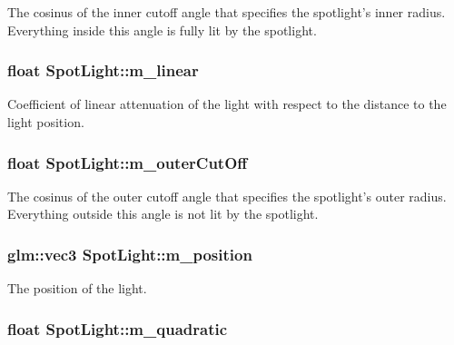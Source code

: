 The cosinus of the inner cutoff angle that specifies the spotlight's inner radius. Everything inside this angle is fully lit by the spotlight. \hypertarget{classSpotLight_a9127c53d783524782e2a6f31b8702173}{
\subsubsection[{m\+\_\+linear}]{\setlength{\rightskip}{0pt plus 5cm}float Spot\+Light\+::m\+\_\+linear\hspace{0.3cm}{\ttfamily [private]}}}\label{classSpotLight_a9127c53d783524782e2a6f31b8702173}
Coefficient of linear attenuation of the light with respect to the distance to the light position. \hypertarget{classSpotLight_a48ede6ee3dc2397941d4d8b96e6bd76a}{
\subsubsection[{m\+\_\+outer\+Cut\+Off}]{\setlength{\rightskip}{0pt plus 5cm}float Spot\+Light\+::m\+\_\+outer\+Cut\+Off\hspace{0.3cm}{\ttfamily [private]}}}\label{classSpotLight_a48ede6ee3dc2397941d4d8b96e6bd76a}
The cosinus of the outer cutoff angle that specifies the spotlight's outer radius. Everything outside this angle is not lit by the spotlight. \hypertarget{classSpotLight_ab10a89bbb4076364f7f028b750207522}{
\subsubsection[{m\+\_\+position}]{\setlength{\rightskip}{0pt plus 5cm}glm\+::vec3 Spot\+Light\+::m\+\_\+position\hspace{0.3cm}{\ttfamily [private]}}}\label{classSpotLight_ab10a89bbb4076364f7f028b750207522}
The position of the light. \hypertarget{classSpotLight_a6d81863546c671662f84b71a15328654}{
\subsubsection[{m\+\_\+quadratic}]{\setlength{\rightskip}{0pt plus 5cm}float Spot\+Light\+::m\+\_\+quadratic\hspace{0.3cm}{\ttfamily [private]}}}\label{classSpotLight_a6d81863546c671662f84b71a15328654}
